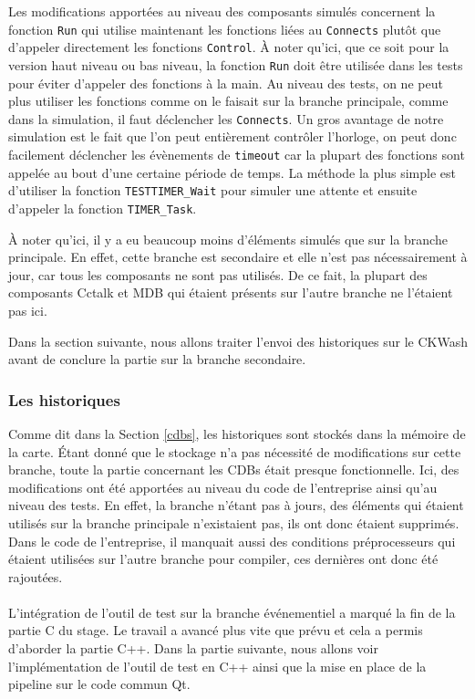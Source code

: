 \documentclass[a4paper]{article}
\begin{document}
Les modifications apportées au niveau des composants simulés concernent la
fonction \verb|Run| qui utilise maintenant les fonctions liées au \verb|Connects|
plutôt que d'appeler directement les fonctions \verb|Control|. À noter qu'ici,
que ce soit pour la version haut niveau ou bas niveau, la fonction \verb|Run|
doit être utilisée dans les tests pour éviter d'appeler des fonctions à la main.
Au niveau des tests, on ne peut plus utiliser les fonctions comme on le faisait
sur la branche principale, comme dans la simulation, il faut déclencher les
\verb|Connects|. Un gros avantage de notre simulation est le fait que l'on peut
entièrement contrôler l'horloge, on peut donc facilement déclencher les
évènements de \verb|timeout| car la plupart des fonctions sont appelée au bout
d'une certaine période de temps. La méthode la plus simple est d'utiliser la
fonction \verb|TESTTIMER_Wait| pour simuler une attente et ensuite d'appeler la
fonction \verb|TIMER_Task|.

À noter qu'ici, il y a eu beaucoup moins d'éléments simulés que sur la branche
principale. En effet, cette branche est secondaire et elle n'est pas
nécessairement à jour, car tous les composants ne sont pas utilisés. De ce fait,
la plupart des composants Cctalk et MDB qui étaient présents sur l'autre branche
ne l'étaient pas ici.

Dans la section suivante, nous allons traiter l'envoi des historiques sur le
CKWash avant de conclure la partie sur la branche secondaire.

\subsubsection*{Les historiques}

Comme dit dans la Section \ref{cdbs}, les historiques sont stockés dans la
mémoire de la carte. Étant donné que le stockage n'a pas nécessité de
modifications sur cette branche, toute la partie concernant les CDBs était presque
fonctionnelle. Ici, des modifications ont été apportées au niveau du code de
l'entreprise ainsi qu'au niveau des tests. En effet, la branche n'étant pas à
jours, des éléments qui étaient utilisés sur la branche principale n'existaient
pas, ils ont donc étaient supprimés. Dans le code de l'entreprise, il manquait
aussi des conditions préprocesseurs qui étaient utilisées sur l'autre branche
pour compiler, ces dernières ont donc été rajoutées.
\\~\\

L'intégration de l'outil de test sur la branche événementiel a marqué la fin de
la partie C du stage. Le travail a avancé plus vite que prévu et cela a permis
d'aborder la partie C++. Dans la partie suivante, nous allons voir
l'implémentation de l'outil de test en C++ ainsi que la mise en place de la
pipeline sur le code commun Qt.
\end{document}

